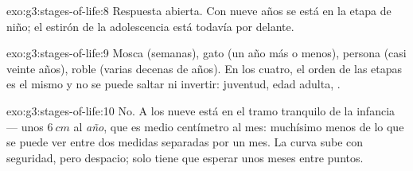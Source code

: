 \begin{solution}{exo:g3:stages-of-life:8}
Respuesta abierta. Con nueve años se está en la etapa de niño; el
estirón de la adolescencia está todavía por delante.
\end{solution}

\begin{solution}{exo:g3:stages-of-life:9}
Mosca (semanas), gato (un año más o menos), persona (casi veinte
años), roble (varias decenas de años). En los cuatro, el orden de las
etapas es el mismo y no se puede saltar ni invertir: juventud, edad
adulta, .
\end{solution}

\begin{solution}{exo:g3:stages-of-life:10}
No. A los nueve está en el tramo tranquilo de la infancia --- unos
$\qty{6}{cm}$ al \emph{año}, que es medio centímetro al mes:
muchísimo menos de lo que se puede ver entre dos medidas separadas por
un mes. La curva sube con seguridad, pero despacio; solo tiene que
esperar unos meses entre puntos.
\end{solution}
